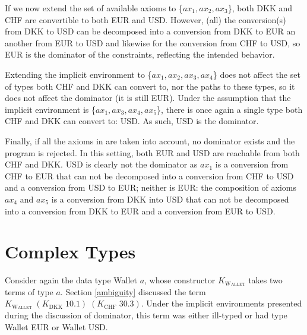 If we now extend the set of available axioms to \{$ax_1,ax_2,ax_3$\}, both DKK and CHF are convertible to both EUR and USD. However, (all) the conversion(s) from DKK to USD can be decomposed into a conversion from DKK to EUR an another from EUR to USD and likewise for the conversion from CHF to USD, so EUR is the dominator of the constraints, reflecting the intended behavior.

Extending the implicit environment to \{$ax_1,ax_2,ax_3,ax_4$\} does not affect the set of types both CHF and DKK can convert to, nor the paths to these types, so it does not affect the dominator (it is still EUR). Under the assumption that the implicit environment is \{$ax_1,ax_3,ax_4,ax_5$\}, there is once again a single type both CHF and DKK can convert to: USD. As such, USD is the dominator.

Finally, if all the axioms in  are taken into account, no dominator exists and the program is rejected. In this setting, both EUR and USD are reachable from both CHF and DKK. USD is clearly not the dominator as $ax_1$ is a conversion from CHF to EUR that can not be decomposed into a conversion from CHF to USD and a conversion from USD to EUR; neither is EUR: the composition of axioms $ax_4$ and $ax_5$ is a conversion from DKK into USD that can not be decomposed into a conversion from DKK to EUR and a conversion from EUR to USD.


\section{Complex Types}
\label{complex types}
Consider again the data type Wallet $a$, whose constructor \textsc{$K_{\text{Wallet}}$} takes two terms of type $a$. Section \ref{ambiguity} discussed the term \textsc{$K_{\text{Wallet}}\;(K_{\text{DKK}}\;10.1)\;(K_{\text{CHF}}\;30.3)$}. Under the implicit environments presented during the discussion of dominator, this term was either ill-typed or had type Wallet EUR or Wallet USD.

